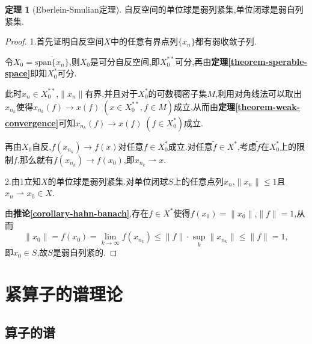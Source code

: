 \documentclass{ctexart}
\theoremstyle{definition}
\newtheorem{theorem}{定理}
\theoremstyle{remark}
\newcommand\thmref[1]{\textbf{定理\ref{#1}}}
\newcommand\cororef[1]{\textbf{推论\ref{#1}}}
\begin{document}
	\begin{theorem}[Eberlein-Smulian定理]
		自反空间的单位球是弱列紧集,单位闭球是弱自列紧集.
	\end{theorem}
	\begin{proof}
		1.首先证明自反空间$X$中的任意有界点列$\{x_n\}$都有弱收敛子列.
		
		令$X_0=\overline{\mathrm{span}\{x_n\}}$,则$X_0$是可分自反空间,即$X_0^{**}$可分,再由\thmref{theorem-sperable-space}即知$X_0^*$可分.
		
		此时$x_n\in X_0^{**}$,$\|x_n\|$有界,并且对于$X_0^*$的可数稠密子集$M$,利用对角线法可以取出$x_{n_k}$使得$x_{n_k}(f)\to x(f)\;(x\in X_0^{**},f\in M)$成立,从而由\thmref{theorem-weak-convergence}可知$x_{n_k}(f)\to x(f)\;(f\in X_0^*)$成立.
		
		再由$X_0$自反,$f(x_{n_k})\to f(x)$对任意$f\in X_0^*$成立.对任意$\tilde{f}\in X^*$,考虑$\tilde{f}$在$X_0^*$上的限制$f$,那么就有$f(x_{n_k})\to f(x_0)$,即$x_{n_k}\rightharpoonup x$.
		
		2.由1立知$X$的单位球是弱列紧集.对单位闭球$S$上的任意点列$x_n$,$\|x_n\|\le 1$且$x_n\rightharpoonup x_0\in X$.
		
		由\cororef{corollary-hahn-banach},存在$f\in X^*$使得$f(x_0)=\|x_0\|$,$\|f\|=1$,从而
		$$\|x_0\|=f(x_0)=\lim_{k\to\infty}{f(x_{n_k})}\le\|f\|\cdot\sup_{k}{\|x_{n_k}\|}\le\|f\|=1,$$
		即$x_0\in S$,故$S$是弱自列紧的.
	\end{proof}
	
	\newpage
	
	\section{紧算子的谱理论}
	
	\subsection{算子的谱}
	
\end{document}
